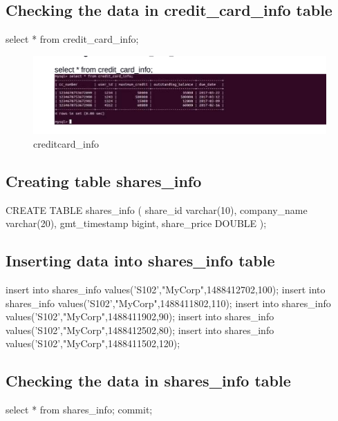 \subsection{Checking the data in credit\_card\_info table}
select * from credit\_card\_info; \newline

\begin{figure}[H]
\centering
\includegraphics[width=12cm,height=3cm]{creditcard.png}
    \caption{creditcard\_info}
\end{figure}




\subsection{Creating table shares\_info}
CREATE TABLE shares\_info \newline
( \newline
share\_id varchar(10), \newline
company\_name varchar(20), \newline
gmt\_timestamp bigint, \newline
share\_price DOUBLE \newline
); \newline

\subsection{Inserting data into shares\_info table}
insert into shares\_info values('S102',"MyCorp",1488412702,100);\newline
insert into shares\_info values('S102',"MyCorp",1488411802,110);\newline
insert into shares\_info values('S102',"MyCorp",1488411902,90);\newline
insert into shares\_info values('S102',"MyCorp",1488412502,80);\newline
insert into shares\_info values('S102',"MyCorp",1488411502,120);\newline

\subsection{Checking the data in shares\_info table}
select * from shares\_info; \newline
commit; \newline


